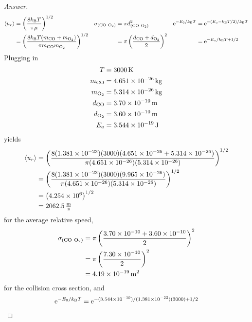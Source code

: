 \documentclass[../psets.tex]{subfiles}
\begin{document}
\begin{enumerate}[label={\textbf{30-\arabic*.}},leftmargin=3.5em]
\begin{proof}[Answer]
        \begin{align*}
            \prb{u_r} &= \left( \frac{8\kB T}{\pi\mu} \right)^{1/2}&
                \sigma_{(\ce{CO}\ \ce{O2})} &= \pi d_{(\ce{CO}\ \ce{O2})}^2&
                    \e[-E_0/\kB T] &= \e[-(E_a-\kB T/2)/\kB T]\\
            &= \left( \frac{8\kB T(m_{\ce{CO}}+m_{\ce{O2}})}{\pi m_{\ce{CO}}m_{\ce{O2}}} \right)^{1/2}&
                &= \pi\left( \frac{d_{\ce{CO}}+d_{\ce{O2}}}{2} \right)^2&
                    &= \e[-E_a/\kB T+1/2]
        \end{align*}
        Plugging in
        \begin{align*}
            T &= \SI{3000}{\kelvin}\\
            m_{\ce{CO}} &= \SI{4.651e-26}{\kilo\gram}\\
            m_{\ce{O2}} &= \SI{5.314e-26}{\kilo\gram}\\
            d_{\ce{CO}} &= \SI{3.70e-10}{\meter}\\
            d_{\ce{O2}} &= \SI{3.60e-10}{\meter}\\
            E_a &= \SI{3.544e-19}{\joule}
        \end{align*}
        yields
        \begin{align*}
            \prb{u_r} &= \left( \frac{8(\num{1.381e-23})(\num{3000})(\num{4.651e-26}+\num{5.314e-26})}{\pi(\num{4.651e-26})(\num{5.314e-26})} \right)^{1/2}\\
            &= \left( \frac{8(\num{1.381e-23})(\num{3000})(\num{9.965e-26})}{\pi(\num{4.651e-26})(\num{5.314e-26})} \right)^{1/2}\\
            &= \left( \num{4.254e6} \right)^{1/2}\\
            &= \SI[per-mode=fraction,fraction-function=\tfrac]{2062.5}{\meter\per\second}
        \end{align*}
        for the average relative speed,
        \begin{align*}
            \sigma_{(\ce{CO}\ \ce{O2})} &= \pi\left( \frac{\num{3.70e-10}+\num{3.60e-10}}{2} \right)^2\\
            &= \pi\left( \frac{\num{7.30e-10}}{2} \right)^2\\
            &= \SI{4.19e-19}{\square\meter}
        \end{align*}
        for the collision cross section, and
        \begin{align*}
            \e[-E_0/\kB T] &= \e[-(\num{3.544e-19})/(\num{1.381e-23})(\num{3000})+1/2]\\

\end{align*}
\end{proof}
\end{enumerate}
\end{document}
